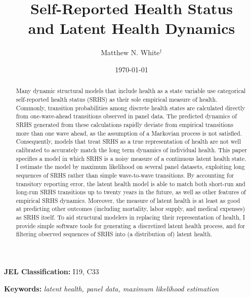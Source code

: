 \documentclass[12pt,pdftex,letterpaper]{article}
\begin{document}
\title{Self-Reported Health Status \\ and Latent Health Dynamics}
\author{Matthew N. White$^\dagger$}
\date{\today}

\begin{singlespace}
\maketitle

\begin{abstract}
	Many dynamic structural models that include health as a state variable use categorical self-reported health status (SRHS) as their sole empirical measure of health. Commonly, transition probabilities among discrete health states are calculated directly from one-wave-ahead transitions observed in panel data.  The predicted dynamics of SRHS generated from these calculations rapidly deviate from empirical transitions more than one wave ahead, as the assumption of a Markovian process is not satisfied.  Consequently, models that treat SRHS as a true representation of health are not well calibrated to accurately match the long term dynamics of individual health.  This paper specifies a model in which SRHS is a noisy measure of a continuous latent health state. I estimate the model by maximum likelihood on several panel datasets, exploiting long sequences of SRHS rather than simple wave-to-wave transitions.  By accounting for transitory reporting error, the latent health model is able to match both short-run and long-run SRHS transitions up to twenty years in the future, as well as other features of empirical SRHS dynamics. Moreover, the measure of latent health is at least as good at predicting other outcomes (including mortality, labor supply, and medical expenses) as SRHS itself. To aid structural modelers in replacing their representation of health, I provide simple software tools for generating a discretized latent health process, and for filtering observed sequences of SRHS into (a distribution of) latent health.
\end{abstract}

\end{singlespace}

\noindent \textbf{JEL Classification:} I19, C33

\vspace{0.25cm}

\noindent \textbf{Keywords:} \textit{latent health, panel data, maximum likelihood estimation}
\end{document}
